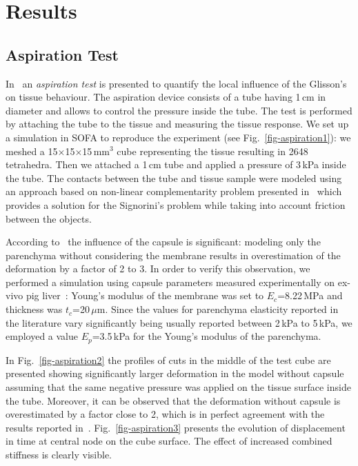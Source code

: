 \section{Results} %
\subsection{Aspiration Test}
In~\cite{Hollenstein2006} an \emph{aspiration test} is presented to quantify the local influence of the Glisson's on tissue behaviour.
The aspiration device consists of a tube having 1\,cm in diameter and allows to
control the pressure inside the tube. The test is performed by
attaching the tube to the tissue and measuring the tissue response. We
set up a simulation in SOFA to reproduce the experiment (see
Fig.~\ref{fig-aspiration1}): we meshed a 15$\times$15$\times$15\,mm$^3$ 
cube representing the tissue resulting in 2648 tetrahedra. Then we attached a 1\,cm tube 
and applied a pressure of 3\,kPa inside the tube. The contacts between the tube and tissue sample were modeled using 
an approach based on non-linear complementarity problem presented in~\cite{Duriez2006b} which provides a solution for 
the Signorini's problem while taking into account friction between the objects.

According to~\cite{Hollenstein2006} the influence of the capsule is significant: modeling 
only the parenchyma without considering the membrane results in overestimation of the deformation by a factor of 2 to 3. 
In order to verify this observation, we performed a simulation using capsule parameters measured experimentally on 
ex-vivo pig liver~\cite{Umale2011}: Young's modulus of the membrane was set to $E_c$=8.22\,MPa and thickness was
$t_c$=20\,$\mu$m. 
Since the values for parenchyma elasticity reported in the literature vary significantly being usually reported between 2\,kPa to 5\,kPa, 
we employed a value $E_p$=3.5\,kPa for the Young's modulus of the parenchyma. 

In Fig.~\ref{fig-aspiration2} the profiles of cuts in the middle of the
test cube are presented showing significantly larger deformation in the model without capsule assuming that the same negative pressure was applied 
on the tissue surface inside the tube. Moreover, it can be observed that the deformation without capsule is overestimated by a factor 
close to 2, which is in perfect agreement with the results reported in~\cite{Hollenstein2006}.
Fig.~\ref{fig-aspiration3} presents the evolution of displacement in time at central node on the cube surface. The effect of increased combined stiffness is clearly visible.


